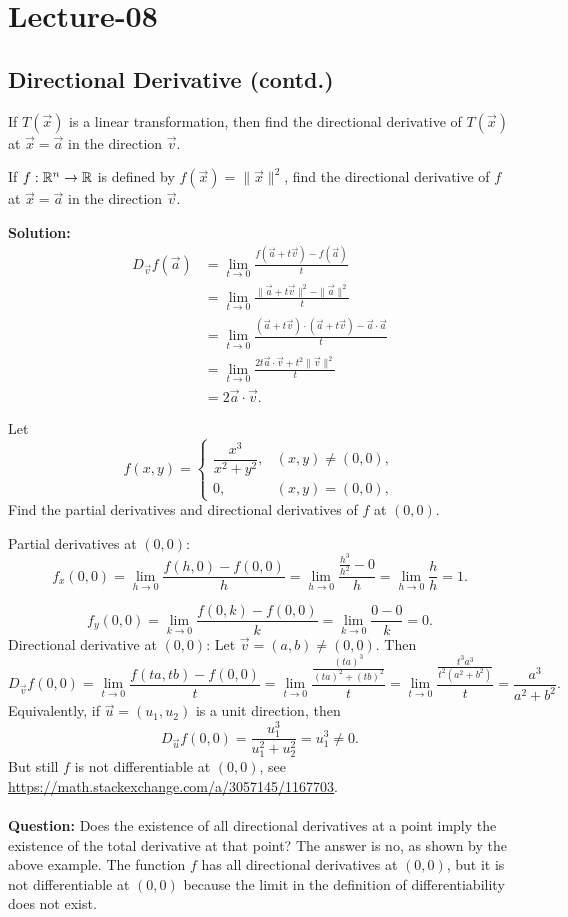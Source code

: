 \newpage
\section{Lecture-08}
\subsection{Directional Derivative (contd.)}
\begin{problem}
  If $T(\vec x)$ is a linear transformation, then find the directional derivative of $T(\vec x)$ at $\vec x=\vec a$ in the direction $\vec{v}$.
\end{problem}
\begin{problem}
  If $f:\mathbb{R}^n\to\mathbb{R}$ is defined by $f(\vec x)=\|\vec x\|^2$, find
the directional derivative of $f$ at $\vec x=\vec a$ in the direction $\vec{v}$.
\end{problem}
\textbf{Solution: }
\begin{align*}
D_{\vec v}f(\vec a) &= \lim_{t\to 0} \frac{f(\vec a+t\vec v)-f(\vec a)}{t}\\
&= \lim_{t\to 0} \frac{\|\vec a+t\vec v\|^2-\|\vec a\|^2}{t}\\
&= \lim_{t\to 0} \frac{(\vec a+t\vec v)\cdot(\vec a+t\vec v)-\vec a\cdot \vec a}{t}\\
&= \lim_{t\to 0} \frac{2t\vec a\cdot \vec v+t^2\|\vec v\|^2}{t}\\
&= 2\vec a\cdot \vec v.
\end{align*}
\begin{example}
Let
\[
f(x,y)=
\begin{cases}
\dfrac{x^3}{x^2+y^2}, & (x,y)\neq (0,0),\\[6pt]
0, & (x,y)=(0,0),
\end{cases}
\]
Find the partial derivatives and directional derivatives of $f$ at $(0,0)$.
\end{example}
Partial derivatives at \((0,0)\):
\[
f_x(0,0)=\lim_{h\to 0}\frac{f(h,0)-f(0,0)}{h}
=\lim_{h\to 0}\frac{\frac{h^3}{h^2}-0}{h}
=\lim_{h\to 0}\frac{h}{h}=1.
\]

\[
f_y(0,0)=\lim_{k\to 0}\frac{f(0,k)-f(0,0)}{k}
=\lim_{k\to 0}\frac{0-0}{k}=0.
\]
Directional derivative at \((0,0)\):
Let \(\vec v=(a,b)\neq (0,0)\). Then
\[
D_{\vec v}f(0,0)
=\lim_{t\to 0}\frac{f(ta,tb)-f(0,0)}{t}
=\lim_{t\to 0}\frac{\frac{(ta)^3}{(ta)^2+(tb)^2}}{t}
=\lim_{t\to 0}\frac{\frac{t^3a^3}{t^2(a^2+b^2)}}{t}
=\frac{a^3}{a^2+b^2}.
\]
Equivalently, if \(\vec u=(u_1,u_2)\) is a unit direction, then
\[
D_{\vec u}f(0,0)=\frac{u_1^3}{u_1^2+u_2^2}=u_1^3\neq 0.
\]
But still $f$ is not differentiable at $(0,0)$, see \url{https://math.stackexchange.com/a/3057145/1167703}.\\~\\  
\textbf{Question:} Does the existence of all directional derivatives at a point imply the existence of the total derivative at that point? The answer is no, as shown by the above example. The function $f$ has all directional derivatives at $(0,0)$, but it is not differentiable at $(0,0)$ because the limit in the definition of differentiability does not exist.

